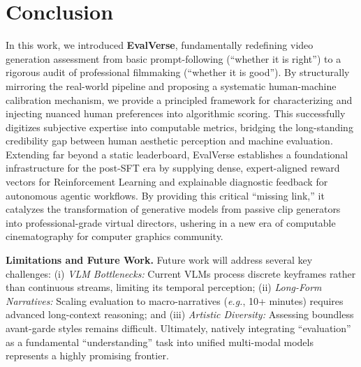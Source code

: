 \documentclass{article}
\begin{document}


\section{Conclusion}

In this work, we introduced \textbf{EvalVerse}, fundamentally redefining video generation assessment from basic prompt-following (``whether it is right'') to a rigorous audit of professional filmmaking (``whether it is good''). By structurally mirroring the real-world pipeline and proposing a systematic human-machine calibration mechanism, we provide a principled framework for characterizing and injecting nuanced human preferences into algorithmic scoring. This successfully digitizes subjective expertise into computable metrics, bridging the long-standing credibility gap between human aesthetic perception and machine evaluation. Extending far beyond a static leaderboard, EvalVerse establishes a foundational infrastructure for the post-SFT era by supplying dense, expert-aligned reward vectors for Reinforcement Learning and explainable diagnostic feedback for autonomous agentic workflows. By providing this critical ``missing link,'' it catalyzes the transformation of generative models from passive clip generators into professional-grade virtual directors, ushering in a new era of computable cinematography for computer graphics community.



\noindent
\textbf{Limitations and Future Work.} Future work will address several key challenges: (i) \textit{VLM Bottlenecks:} Current VLMs process discrete keyframes rather than continuous streams, limiting its temporal perception; (ii) \textit{Long-Form Narratives:} Scaling evaluation to macro-narratives (\emph{e.g.}, 10+ minutes) requires advanced long-context reasoning; and (iii) \textit{Artistic Diversity:} Assessing boundless avant-garde styles remains difficult. Ultimately, natively integrating ``evaluation'' as a fundamental ``understanding'' task into unified multi-modal models represents a highly promising frontier.
\end{document}
